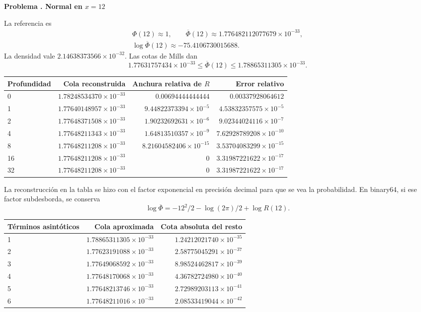\documentclass[11pt,a4paper]{article}
\theoremstyle{definition}
\newcommand{\Q}{\overline\Phi}
\newcounter{problema}
\newenvironment{resuelto}[1]{\refstepcounter{problema}\par\medskip\Needspace{6\baselineskip}\textbf{Problema \theproblema. #1}\par}{\par\medskip}
\begin{document}
\begin{resuelto}{Normal en $x=12$}
La referencia es
\[
\begin{gathered}
\Phi(12)\approx1,\qquad \Q(12)\approx1.776482112077679\times10^{-33},\\
\log\Q(12)\approx-75.4106730015688.
\end{gathered}
\]
La densidad vale $2.14638373566\times10^{-32}$. Las cotas de Mills dan
\[
1.77631757434\times10^{-33}\le\Q(12)\le1.78865311305\times10^{-33}.
\]

\begin{center}\small\begin{tabular}{lrrr}
\toprule
Profundidad & Cola reconstruida & Anchura relativa de $R$ & Error relativo\\\midrule
0 & $1.78248534370\times10^{-33}$ & $0.00694444444444$ & $0.00337928064612$\\
1 & $1.77640148957\times10^{-33}$ & $9.44822373394\times10^{-5}$ & $4.53832357575\times10^{-5}$\\
2 & $1.77648371508\times10^{-33}$ & $1.90232692631\times10^{-6}$ & $9.02344024116\times10^{-7}$\\
4 & $1.77648211343\times10^{-33}$ & $1.64813510357\times10^{-9}$ & $7.62928789208\times10^{-10}$\\
8 & $1.77648211208\times10^{-33}$ & $8.21604582406\times10^{-15}$ & $3.53704083299\times10^{-15}$\\
16 & $1.77648211208\times10^{-33}$ & $0$ & $3.31987221622\times10^{-17}$\\
32 & $1.77648211208\times10^{-33}$ & $0$ & $3.31987221622\times10^{-17}$\\
\bottomrule\end{tabular}\end{center}

La reconstrucción en la tabla se hizo con el factor exponencial en precisión decimal para que se vea la probabilidad. En binary64, si ese factor subdesborda, se conserva
\[
\log\Q=-12^2/2-\log(2\pi)/2+\log R(12).
\]

\begin{center}\small\begin{tabular}{lrr}
\toprule
Términos asintóticos & Cola aproximada & Cota absoluta del resto\\\midrule
1 & $1.78865311305\times10^{-33}$ & $1.24212021740\times10^{-35}$\\
2 & $1.77623191088\times10^{-33}$ & $2.58775045291\times10^{-37}$\\
3 & $1.77649068592\times10^{-33}$ & $8.98524462817\times10^{-39}$\\
4 & $1.77648170068\times10^{-33}$ & $4.36782724980\times10^{-40}$\\
5 & $1.77648213746\times10^{-33}$ & $2.72989203113\times10^{-41}$\\
6 & $1.77648211016\times10^{-33}$ & $2.08533419044\times10^{-42}$\\
\bottomrule\end{tabular}\end{center}


\end{resuelto}
\end{document}
